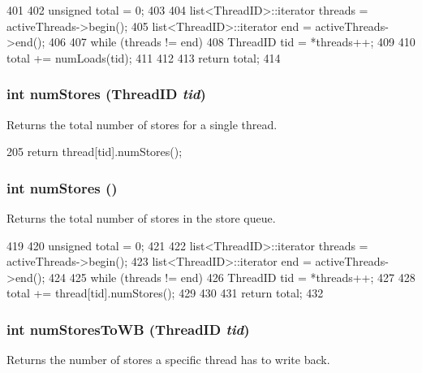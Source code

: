 \begin{DoxyCode}
401 {
402     unsigned total = 0;
403 
404     list<ThreadID>::iterator threads = activeThreads->begin();
405     list<ThreadID>::iterator end = activeThreads->end();
406 
407     while (threads != end) {
408         ThreadID tid = *threads++;
409 
410         total += numLoads(tid);
411     }
412 
413     return total;
414 }
\end{DoxyCode}
\hypertarget{classLSQ_a12346c097127dd67f1f9e8d28e12858f}{
\subsubsection[{numStores}]{\setlength{\rightskip}{0pt plus 5cm}int numStores ({\bf ThreadID} {\em tid})}}
\label{classLSQ_a12346c097127dd67f1f9e8d28e12858f}
Returns the total number of stores for a single thread. 


\begin{DoxyCode}
205     { return thread[tid].numStores(); }
\end{DoxyCode}
\hypertarget{classLSQ_aa0fc32a4a9d77696f5907f4d25e7d07f}{
\subsubsection[{numStores}]{\setlength{\rightskip}{0pt plus 5cm}int numStores ()}}
\label{classLSQ_aa0fc32a4a9d77696f5907f4d25e7d07f}
Returns the total number of stores in the store queue. 


\begin{DoxyCode}
419 {
420     unsigned total = 0;
421 
422     list<ThreadID>::iterator threads = activeThreads->begin();
423     list<ThreadID>::iterator end = activeThreads->end();
424 
425     while (threads != end) {
426         ThreadID tid = *threads++;
427 
428         total += thread[tid].numStores();
429     }
430 
431     return total;
432 }
\end{DoxyCode}
\hypertarget{classLSQ_a4115edd209f7e5e51c3a17d40edd9e7a}{
\subsubsection[{numStoresToWB}]{\setlength{\rightskip}{0pt plus 5cm}int numStoresToWB ({\bf ThreadID} {\em tid})}}
\label{classLSQ_a4115edd209f7e5e51c3a17d40edd9e7a}
Returns the number of stores a specific thread has to write back. 


